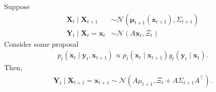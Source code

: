 \begin{proposition} \label{prop:gaussian-exact}
    Suppose
    \begin{align*}
        \mathbf{X}_{t} \mid \mathbf{X}_{t+1} &\sim \mathcal{N}\left( \mathbf{\mu}_{t+1}(\mathbf{x}_{t+1}), \Sigma_{t+1} \right)  \\
        \mathbf{Y}_{t} \mid \mathbf{X}_{t} = \mathbf{x}_{t} &\sim \mathcal{N}\left( A\mathbf{x}_{t}, \Xi_{t} \right)
    \end{align*}
    Consider some proposal
    \begin{align*}
        p_{t}(\mathbf{x}_{t} \mid \mathbf{y}_{t}, \mathbf{x}_{t+1}) \propto p_{t}(\mathbf{x}_{t} \mid \mathbf{x}_{t+1})g_{t}(\mathbf{y}_{t} \mid \mathbf{x}_{t}).
    \end{align*}
    Then,
    \begin{align*}
        \mathbf{Y}_{t} \mid \mathbf{X}_{t+1} = \mathbf{x}_{t+1} \sim \mathcal{N}\left( A\mu_{t+1}, \Xi_{t} + A\Sigma_{t+1}A^\top \right).
    \end{align*}
\end{proposition}
